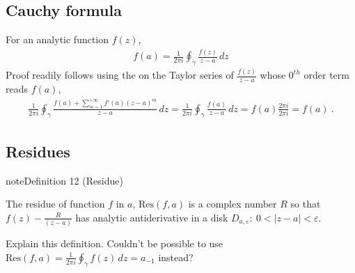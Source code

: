 \documentclass[letterpaper,10pt,english]{jupyterBook}
\begin{document}
\subsection{Cauchy formula}
\label{\detokenize{ch/complex/analysis:cauchy-formula}}\label{\detokenize{ch/complex/analysis:complex-analysis-mero-fun-cauchy-formula}}
\sphinxAtStartPar
For an analytic function \(f(z)\),
\begin{equation*}
\begin{split}f(a) = \frac{1}{2 \pi i} \oint_{\gamma} \frac{f(z)}{z-a} \, dz\end{split}
\end{equation*}
\sphinxAtStartPar
Proof readily follows using the {\hyperref[\detokenize{ch/complex/analysis:complex-analysis-useful-int-path-independence-z-n}]{}} on the Taylor series of \(\frac{f(z)}{z-a}\) whose \(0^{th}\) order term reads \(f(a)\),
\begin{equation*}
\begin{split}\frac{1}{2\pi i} \oint_{\gamma} \frac{f(a)+\sum_{m=1}^{+\infty} f'(a) (z-a)^m}{z-a} \, dz = \frac{1}{2\pi i} \oint_{\gamma} \frac{f(a)}{z-a} \, dz = f(a) \frac{2 \pi i}{2 \pi i} = f(a) \ .\end{split}
\end{equation*}

\subsection{Residues}
\label{\detokenize{ch/complex/analysis:residues}}\label{\detokenize{ch/complex/analysis:complex-analysis-mero-fun-residues}}\label{ch/complex/analysis:definition-5}
\begin{sphinxadmonition}{note}{Definition 12 (Residue)}



\sphinxAtStartPar
The residue of function \(f\) in \(a\), \(\text{Res}(f,a)\) is a complex number \(R\) so that \(f(z) - \frac{R}{(z-a)}\) has analytic antiderivative in a disk \(D_{a,\varepsilon}: \ 0 < |z-a| < \varepsilon\).
\end{sphinxadmonition}

\sphinxAtStartPar
{} Explain this definition. Couldn’t be possible to use \(\text{Res}(f,a) = \frac{1}{2 \pi i} \oint_{\gamma} f(z) \, dz = a_{-1}\) instead?
\end{document}
